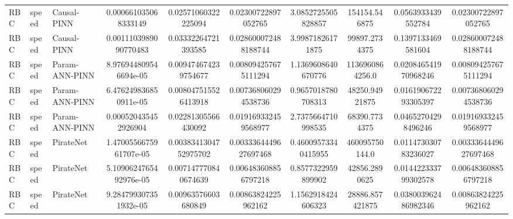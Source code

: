 \begin{landscape}
\begin{longtable}{lllccccccc}
 RBC & speed &    Causal-PINN &   0.000661035068333149 &    0.02571060322225094 &    0.02300722897052765 &   3.0852725505828857 &         154154.546875 &    0.0563933439552784 &    0.02300722897052765 \\
 RBC & speed &    Causal-PINN &  0.0011103989090770483 &    0.03332264721393585 &   0.028600072488188744 &     3.99871826171875 &         99897.2734375 &    0.1397133469581604 &   0.028600072488188744 \\
 RBC & speed & Param-ANN-PINN &  8.976944809546694e-05 &   0.009474674239754677 &   0.008094257675111294 &   1.1369608640670776 &       1136960864256.0 &  0.020846541970968246 &   0.008094257675111294 \\
 RBC & speed & Param-ANN-PINN &  6.476249836850911e-05 &   0.008047515526413918 &   0.007368060294538736 &   0.9657018780708313 &        48250.94921875 &  0.016190672293305397 &   0.007368060294538736 \\
 RBC & speed & Param-ANN-PINN &   0.000520435452926904 &    0.02281305566430092 &   0.019169332459568977 &   2.7375664710998535 &         68390.7734375 &   0.04652704298496246 &   0.019169332459568977 \\
 RBC & speed &      PirateNet & 1.4700556675961707e-05 &  0.0038341304752975702 &  0.0033364449627697468 &  0.46009573340415955 &        460095750144.0 &  0.011473030783236027 &  0.0033364449627697468 \\
 RBC & speed &      PirateNet & 5.1090624765492976e-05 &   0.007147770840674639 &   0.006483608856797218 &   0.8577322959899902 &         42856.2890625 &  0.014422333799302578 &   0.006483608856797218 \\
 RBC & speed &      PirateNet &  9.284799307351932e-05 &    0.00963576603680849 &    0.00863824225962162 &   1.1562918424606323 &       28886.857421875 &  0.038003962486982346 &    0.00863824225962162 \\
\end{longtable}

\normalsize
\end{landscape}
